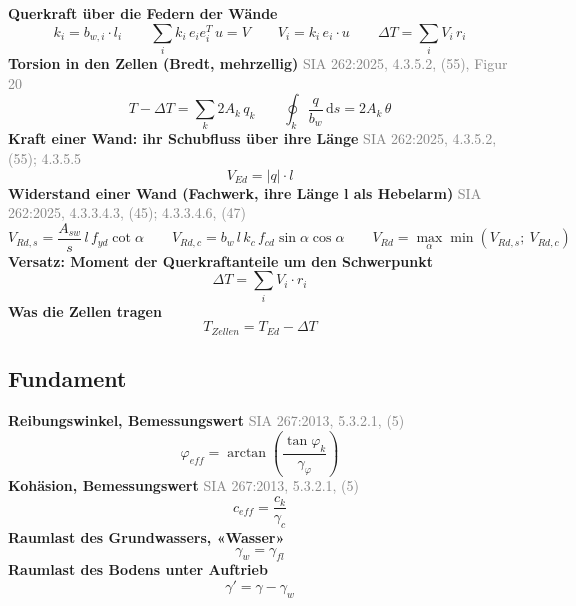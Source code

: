 \documentclass[11pt,a4paper]{article}
\newcommand{\normref}[1]{{\small\textcolor{gray}{#1}}}
\begin{document}
\noindent\textbf{Querkraft über die Federn der Wände}
\begin{equation*}
k_i = b_{w,i} \cdot l_i \qquad \sum_i k_i\, e_i e_i^T\, u = V \qquad V_i = k_i\, e_i \cdot u \qquad \Delta T = \sum_i V_i\, r_i
\end{equation*}
\noindent\textbf{Torsion in den Zellen (Bredt, mehrzellig)} \hfill \normref{SIA 262:2025, 4.3.5.2, (55), Figur 20}
\begin{equation*}
T - \Delta T = \sum_k 2 A_k\, q_k \qquad \oint_k \frac{q}{b_w}\, \mathrm{d}s = 2 A_k\, \theta
\end{equation*}
\noindent\textbf{Kraft einer Wand: ihr Schubfluss über ihre Länge} \hfill \normref{SIA 262:2025, 4.3.5.2, (55); 4.3.5.5}
\begin{equation*}
V_{Ed} = |q| \cdot l
\end{equation*}
\noindent\textbf{Widerstand einer Wand (Fachwerk, ihre Länge l als Hebelarm)} \hfill \normref{SIA 262:2025, 4.3.3.4.3, (45); 4.3.3.4.6, (47)}
\begin{equation*}
V_{Rd,s} = \frac{A_{sw}}{s}\, l\, f_{yd} \cot\alpha \qquad V_{Rd,c} = b_w\, l\, k_c\, f_{cd} \sin\alpha \cos\alpha \qquad V_{Rd} = \max_\alpha \min(V_{Rd,s};\ V_{Rd,c})
\end{equation*}
\noindent\textbf{Versatz: Moment der Querkraftanteile um den Schwerpunkt}
\begin{equation*}
\Delta T = \sum_i V_i \cdot r_i
\end{equation*}
\noindent\textbf{Was die Zellen tragen}
\begin{equation*}
T_{Zellen} = T_{Ed} - \Delta T
\end{equation*}
\subsection{Fundament}
\noindent\textbf{Reibungswinkel, Bemessungswert} \hfill \normref{SIA 267:2013, 5.3.2.1, (5)}
\begin{equation*}
\varphi_{eff} = \arctan\left(\frac{\tan \varphi_k}{\gamma_{\varphi}}\right)
\end{equation*}
\noindent\textbf{Kohäsion, Bemessungswert} \hfill \normref{SIA 267:2013, 5.3.2.1, (5)}
\begin{equation*}
c_{eff} = \frac{c_k}{\gamma_c}
\end{equation*}
\noindent\textbf{Raumlast des Grundwassers, «Wasser»}
\begin{equation*}
\gamma_w = \gamma_{fl}
\end{equation*}
\noindent\textbf{Raumlast des Bodens unter Auftrieb}
\begin{equation*}
\gamma' = \gamma - \gamma_w
\end{equation*}
\end{document}

